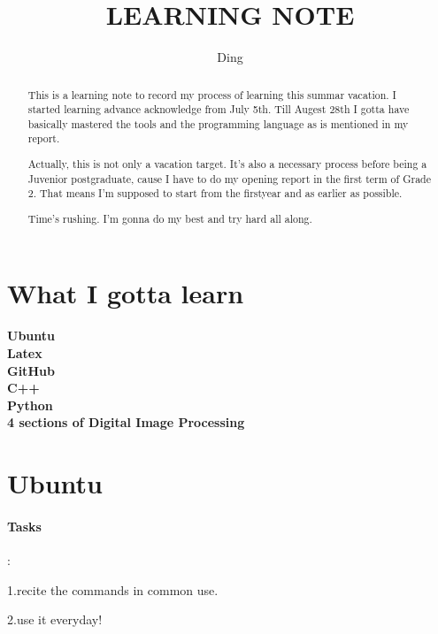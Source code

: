 \documentclass{report}
\author{Ding}
\title{LEARNING NOTE}
\begin{document}
\maketitle

\begin{abstract}
This is a learning note to record my process of learning this summar vacation. I started learning advance acknowledge from July 5th. Till Augest 28th I gotta have basically mastered the tools and the programming language as is mentioned in my report.\par
Actually, this is not only a vacation target. It's also a necessary process before being a Juvenior postgraduate, cause I have to do my opening report in the first term of Grade 2. That means I'm supposed to start from the firstyear and as earlier as possible.\par
Time's rushing. I'm gonna do my best and try hard all along.
\end{abstract}
\tableofcontents

\section{What I gotta learn}
	\paragraph{Ubuntu \\ Latex \\ GitHub \\ C++ \\ Python \\ 4 sections of Digital Image Processing}
\section{Ubuntu}
	\paragraph{Tasks}:\par
	1.recite the commands in common use.\par
	2.use it everyday!
\end{document}
